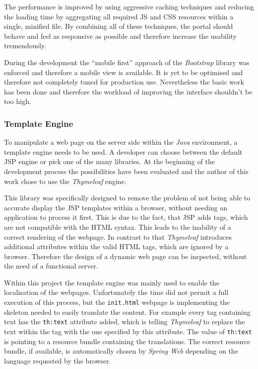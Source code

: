 The performance is improved by using aggressive caching techniques and reducing the loading time by aggregating all required \gls{JS} and \gls{CSS} resources within a single, minified file. By combining all of these techniques, the portal should behave and feel as responsive as possible and therefore increase the usability tremendously.

During the development the \enquote{mobile first} approach of the \emph{Bootstrap} library was enforced and therefore a mobile view is available. It is yet to be optimised and therefore not completely tuned for production use. Nevertheless the basic work has been done and therefore the workload of improving the interface shouldn't be too high.

\subsubsection{Template Engine}

To manipulate a web page on the server side within the \emph{Java} environment, a template engine needs to be used. A developer can choose between the default \gls{JSP} engine or pick one of the many libraries. At the beginning of the development process the possibilities have been evaluated and the author of this work chose to use the \emph{Thymeleaf} engine.

This library was specifically designed to remove the problem of not being able to accurate display the \gls{JSP} templates within a browser, without needing an application to process it first. This is due to the fact, that \gls{JSP} adds tags, which are not compatible with the \gls{HTML} syntax. This leads to the inability of a correct rendering of the webpage. In contrast to that \emph{Thymeleaf} introduces additional attributes within the valid \gls{HTML} tags, which are ignored by a browser. Therefore the design of a dynamic web page can be inspected, without the need of a functional server.

Within this project the template engine was mainly used to enable the localisation of the webpages. Unfortunately the time did not permit a full execution of this process, but the \texttt{init.html} webpage is implementing the skeleton needed to easily translate the content. For example every tag containing text has the \texttt{th:text} attribute added, which is telling \emph{Thymeleaf} to replace the text within the tag with the one specified by this attribute. The value of \texttt{th:text} is pointing to a resource bundle containing the translations. The correct resource bundle, if available, is automatically chosen by \emph{Spring Web} depending on the language requested by the browser.

